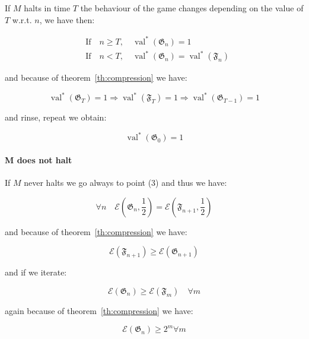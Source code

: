 If $M$ halts in time $T$ the behaviour of the game changes depending on the value of $T$ w.r.t. $n$, we have then:

\begin{align}
&\text{If} \quad n \geq T, \quad \operatorname{val}^{*}(\mathfrak{G}_{n}) = 1 \\
&\text{If} \quad n < T, \quad \operatorname{val}^{*}(\mathfrak{G}_{n}) = \operatorname{val}^{*}(\mathfrak{F}_{n})
\end{align}

and because of theorem~\ref{th:compression} we have:

\begin{equation}
    \operatorname{val}^{*}(\mathfrak{G}_T) = 1 \Rightarrow \operatorname{val}^{*}(\mathfrak{F}_T) = 1 \Rightarrow \operatorname{val}^{*}(\mathfrak{G}_{T-1}) = 1
\end{equation}


and rinse, repeat we obtain:

\begin{equation}
    \operatorname{val}^{*}(\mathfrak{G}_0) = 1
\end{equation}

\paragraph{M does not halt}
If $M$ never halts we go always to point (3) and thus we have:

\begin{equation}
    \forall n \quad \mathscr{E}\left(\mathfrak{G}_{n}, \frac{1}{2}\right)  = \mathscr{E}\left(\mathfrak{F}_{n+1}, \frac{1}{2}\right)
\end{equation}


and because of theorem~\ref{th:compression} we have:

\begin{equation}
    \mathscr{E}\left(\mathfrak{F}_{n+1}\right) \geq \mathscr{E}\left(\mathfrak{G}_{n+1}\right)
\end{equation}

and if we iterate:

\begin{equation}
    \mathscr{E}\left(\mathfrak{G}_{n}\right) \geq \mathscr{E}\left(\mathfrak{F}_{m}\right) \quad \forall m
\end{equation}

again because of theorem~\ref{th:compression} we have:

\begin{equation}
    \mathscr{E}\left(\mathfrak{G}_{n}\right) \geq 2^m \forall m
\end{equation}

